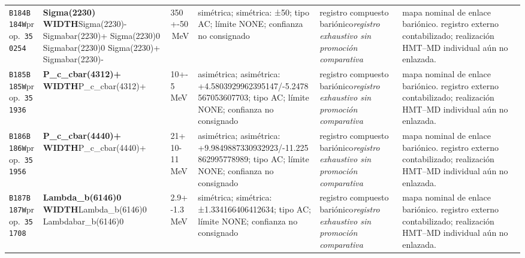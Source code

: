 \begin{landscape}
\begin{longtable}{L{1.85cm}L{4.45cm}L{2.35cm}L{4.05cm}L{3.35cm}L{7.15cm}}
\texttt{B184}\newline \texttt{B184W}\newline prop.\ \texttt{350254} & \textbf{Sigma(2230) WIDTH}\newline Sigma(2230)- \textbar{}\allowbreak{} Sigmabar(2230)+ \textbar{}\allowbreak{} Sigma(2230)0 \textbar{}\allowbreak{} Sigmabar(2230)0 \textbar{}\allowbreak{} Sigma(2230)+ \textbar{}\allowbreak{} Sigmabar(2230)- & 350+-50\,MeV & simétrica; simétrica: ±50; tipo AC; límite NONE; confianza no consignado & registro compuesto bariónico\newline \emph{registro exhaustivo sin promoción comparativa} & mapa nominal de enlace bariónico. registro externo contabilizado; realización HMT--MD individual aún no enlazada. \\
\texttt{B185}\newline \texttt{B185W}\newline prop.\ \texttt{351936} & \textbf{P\_\allowbreak{}c\_\allowbreak{}cbar(4312)+ WIDTH}\newline P\_\allowbreak{}c\_\allowbreak{}cbar(4312)+ & 10+-5\,MeV & asimétrica; asimétrica: +4.5803929962395147/-5.2478567053607703; tipo AC; límite NONE; confianza no consignado & registro compuesto bariónico\newline \emph{registro exhaustivo sin promoción comparativa} & mapa nominal de enlace bariónico. registro externo contabilizado; realización HMT--MD individual aún no enlazada. \\
\texttt{B186}\newline \texttt{B186W}\newline prop.\ \texttt{351956} & \textbf{P\_\allowbreak{}c\_\allowbreak{}cbar(4440)+ WIDTH}\newline P\_\allowbreak{}c\_\allowbreak{}cbar(4440)+ & 21+10-11\,MeV & asimétrica; asimétrica: +9.9849887330932923/-11.225862995778989; tipo AC; límite NONE; confianza no consignado & registro compuesto bariónico\newline \emph{registro exhaustivo sin promoción comparativa} & mapa nominal de enlace bariónico. registro externo contabilizado; realización HMT--MD individual aún no enlazada. \\
\texttt{B187}\newline \texttt{B187W}\newline prop.\ \texttt{351708} & \textbf{Lambda\_\allowbreak{}b(6146)0 WIDTH}\newline Lambda\_\allowbreak{}b(6146)0 \textbar{}\allowbreak{} Lambdabar\_\allowbreak{}b(6146)0 & 2.9+-1.3\,MeV & simétrica; simétrica: ±1.334166406412634; tipo AC; límite NONE; confianza no consignado & registro compuesto bariónico\newline \emph{registro exhaustivo sin promoción comparativa} & mapa nominal de enlace bariónico. registro externo contabilizado; realización HMT--MD individual aún no enlazada. \\

\end{longtable}
\end{landscape}
